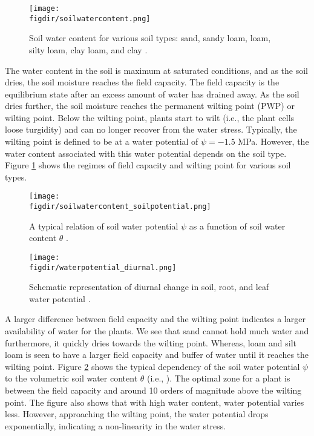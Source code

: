 \begin{figure}[t]
	\centering
	\texttt{[image: \\figdir/soilwatercontent.png]}
	\caption{Soil water content for various soil types: sand, sandy loam, loam, silty loam, clay loam, and clay \citep{nobel2009physicochemical}. }
	\label{fig:soilwatercontent}
\end{figure}

The water content in the soil is maximum at saturated conditions, and as the soil dries, the soil moisture reaches the field capacity. The field capacity is the equilibrium state after an excess amount of water has drained away. As the soil dries further, the soil moisture reaches the permanent wilting point (PWP) or wilting point. Below the wilting point, plants start to wilt (i.e., the plant cells loose turgidity) and can no longer recover from the water stress. Typically, the wilting point is defined to be at a water potential of $\psi=-1.5$ \si{\MPa}. However, the water content associated with this water potential depends on the soil type. Figure \ref{fig:soilwatercontent} shows the regimes of field capacity and wilting point for various soil types. 
	
	\begin{figure}[p]
		\centering
		\texttt{[image: \\figdir/soilwatercontent\_soilpotential.png]}
		\caption{A typical relation of soil water potential $\psi$ as a function of soil water content $\theta$ \citep{nobel2009physicochemical}.}
		\label{fig:soilwatercontent_soilpotential}
	\end{figure}
	
	\begin{figure}[p]
		\centering
		\texttt{[image: \\figdir/waterpotential\_diurnal.png]}
		\caption{Schematic representation  of diurnal change in soil, root, and leaf water potential \citep{nobel2009physicochemical}.}
		\label{fig:waterpotential_diurnal}
	\end{figure}	
	
A larger difference between field capacity and the wilting point indicates a larger availability of water for the plants. We see that sand cannot hold much water and furthermore, it quickly dries towards the wilting point. Whereas, loam and silt loam is seen to have a larger field capacity and buffer of water until it reaches the wilting point. Figure \ref{fig:soilwatercontent_soilpotential} shows the typical dependency of the soil water potential $\psi$ to the volumetric soil water content $\theta$ (i.e., ). The optimal zone for a plant is between the field capacity and around 10 orders of magnitude above the wilting point. The figure also shows that with high water content, water potential varies less. However, approaching the wilting point, the water potential drops exponentially, indicating a non-linearity in the water stress. 

